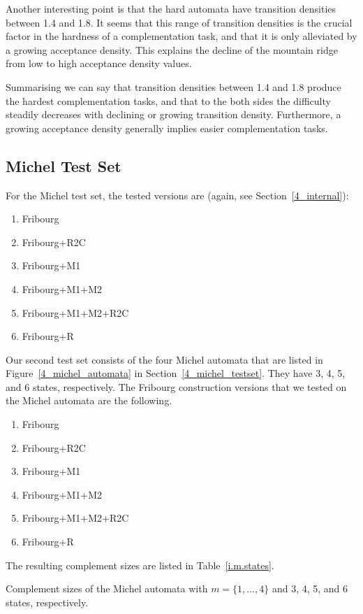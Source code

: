 Another interesting point is that the hard automata have transition densities between 1.4 and 1.8. It seems that this range of transition densities is the crucial factor in the hardness of a complementation task, and that it is only alleviated by a growing acceptance density. This explains the decline of the mountain ridge from low to high acceptance density values.

Summarising we can say that transition densities between 1.4 and 1.8 produce the hardest complementation tasks, and that to the both sides the difficulty steadily decreases with declining or growing transition density. Furthermore, a growing acceptance density generally implies easier complementation tasks.


\subsection{Michel Test Set}
\label{5_internal_michel}
For the Michel test set, the tested versions are (again, see Section~\ref{4_internal}):
\begin{enumerate}
\item Fribourg
\item Fribourg+R2C
\item Fribourg+M1
\item Fribourg+M1+M2
\item Fribourg+M1+M2+R2C
\item Fribourg+R
\end{enumerate}

Our second test set consists of the four Michel automata that are listed in Figure~\ref{4_michel_automata} in Section~\ref{4_michel_testset}. They have 3, 4, 5, and 6 states, respectively. The Fribourg construction versions that we tested on the Michel automata are the following.
\begin{enumerate}
\item Fribourg
\item Fribourg+R2C
\item Fribourg+M1
\item Fribourg+M1+M2
\item Fribourg+M1+M2+R2C
\item Fribourg+R
\end{enumerate}

The resulting complement sizes are listed in Table~\ref{i.m.states}.

\begin{table}[htb]
\centering

\caption{Complement sizes of the Michel automata with $m=\{1,\dots,4\}$ and 3, 4, 5, and 6 states, respectively. }
\label{i.m.states}
\end{table}


